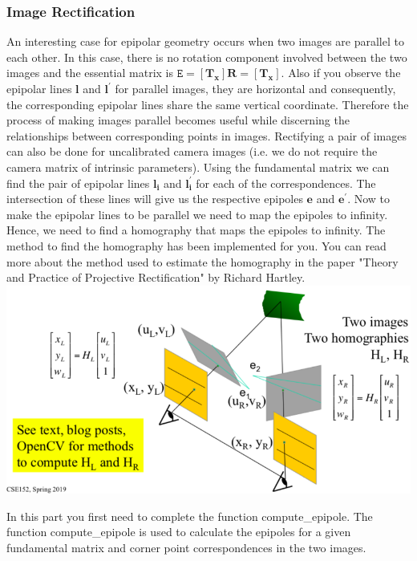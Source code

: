 \documentclass[11pt]{article}
\makeatletter
\def\maxwidth{\ifdim\Gin@nat@width>\linewidth\linewidth
    \else\Gin@nat@width\fi}
\let\Oldincludegraphics\includegraphics
\renewcommand{\includegraphics}[1]{\Oldincludegraphics[width=.8\maxwidth]{#1}}
\makeatother
\begin{document}
    \subsubsection{Image Rectification}\label{image-rectification}

An interesting case for epipolar geometry occurs when two images are
parallel to each other. In this case, there is no rotation component
involved between the two images and the essential matrix is
\(\texttt{E}=[\boldsymbol{T_{x}}]\boldsymbol{R}=[\boldsymbol{T_{x}}]\).
Also if you observe the epipolar lines \(\boldsymbol{l}\) and
\(\boldsymbol{l^{'}}\) for parallel images, they are horizontal and
consequently, the corresponding epipolar lines share the same vertical
coordinate. Therefore the process of making images parallel becomes
useful while discerning the relationships between corresponding points
in images. Rectifying a pair of images can also be done for uncalibrated
camera images (i.e. we do not require the camera matrix of intrinsic
parameters). Using the fundamental matrix we can find the pair of
epipolar lines \(\boldsymbol{l_i}\) and \(\boldsymbol{l^{'}_i}\) for
each of the correspondences. The intersection of these lines will give
us the respective epipoles \(\boldsymbol{e}\) and
\(\boldsymbol{e^{'}}\). Now to make the epipolar lines to be parallel we
need to map the epipoles to infinity. Hence, we need to find a
homography that maps the epipoles to infinity. The method to find the
homography has been implemented for you. You can read more about the
method used to estimate the homography in the paper "Theory and Practice
of Projective Rectification" by Richard Hartley.
\includegraphics{image_rectification.png}

In this part you first need to complete the function compute\_epipole.
The function compute\_epipole is used to calculate the epipoles for a
given fundamental matrix and corner point correspondences in the two
images.
\end{document}
